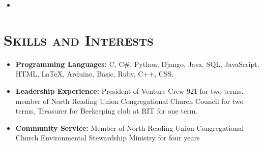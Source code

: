 \documentclass[10pt,letter,roman]{moderncv}
\begin{document}
\vspace{5pt}

\begin{itemize}
\item{}
\end{itemize}

\vspace{2pt}

\section{\textsc{Skills and Interests}}

\vspace{6pt}

\begin{itemize}

\item \textbf{Programming Languages:} C, C\#, Python, Django, Java, SQL, JavaScript, HTML, LaTeX, Arduino, Basic, Ruby, C++, CSS.
\vspace{3pt}
\item \textbf{Leadership Experience:} President of Venture Crew 921 for two terms, member of North Reading Union Congregational Church Council for two terms, Treasurer for Beekeeping club at RIT for one term.
\vspace{3pt}
\item \textbf{Community Service:} Member of North Reading Union Congregational Church Environmental Stewardship Ministry for four years

\end{itemize}
\end{document}
